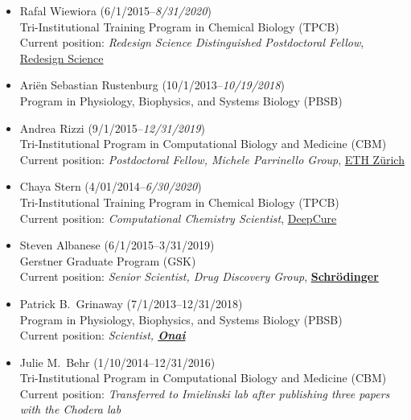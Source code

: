 \documentclass[10pt]{article}
\begin{document}
\begin{itemize}

  \item Rafal Wiewiora (6/1/2015--\emph{8/31/2020})\\
  Tri-Institutional Training Program in Chemical Biology (TPCB)\\
  Current position: \emph{Redesign Science Distinguished Postdoctoral Fellow}, \href{redesignscience.com}{Redesign Science}
  
  \item Ari\"{e}n Sebastian Rustenburg (10/1/2013--\emph{10/19/2018})\\
  Program in Physiology, Biophysics, and Systems Biology (PBSB)\\

  \item Andrea Rizzi (9/1/2015--\emph{12/31/2019})\\
  Tri-Institutional Program in Computational Biology and Medicine (CBM)\\
  Current position: \emph{Postdoctoral Fellow, Michele Parrinello Group}, \href{https://parrinello.ethz.ch/}{ETH Z\"urich}

  \item Chaya Stern (4/01/2014--\emph{6/30/2020})\\
  Tri-Institutional Training Program in Chemical Biology (TPCB)\\
  Current position: \emph{Computational Chemistry Scientist},  \href{http://deepcure.ai}{DeepCure}
 
  \item Steven Albanese (6/1/2015--3/31/2019)\\
  Gerstner Graduate Program (GSK)\\
  Current position: \emph{Senior Scientist, Drug Discovery Group},  \href{http://www.schrodinger.com}{{\bf Schr\"{o}dinger}}
  
  \item Patrick B.~Grinaway (7/1/2013--12/31/2018)\\
  Program in Physiology, Biophysics, and Systems Biology (PBSB)\\
  Current position: \emph{Scientist, \href{https://www.onai.com}{\bf Onai}}

  \item Julie M.~Behr (1/10/2014--12/31/2016)\\
  Tri-Institutional Program in Computational Biology and Medicine (CBM)\\
  Current position: \emph{Transferred to Imielinski lab after publishing three papers with the Chodera lab} 

\end{itemize}
  
\end{document}
